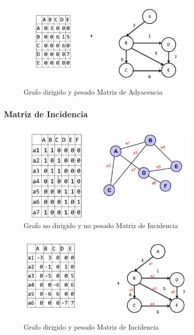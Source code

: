 \documentclass[../main.tex]{subfiles}
\begin{document}
            \begin{figure}[ht]
                \centering
                \includegraphics[width=0.8\textwidth]{images/grafos/grafo_matriz_adyacencia_2}
                \caption{Grafo dirigido y pesado Matriz de Adyacencia} 
            \end{figure}
            
            \newpage

        \subsubsection{Matriz de Incidencia}
            \begin{figure}[ht]
                \centering
                \includegraphics[width=0.8\textwidth]{images/grafos/grafo_matriz_incidencia_1.png}
                \caption{Grafo no dirigido y no pesado Matriz de Incidencia} 
            \end{figure}

            \begin{figure}[ht]
                \centering
                \includegraphics[width=0.8\textwidth]{images/grafos/grafo_matriz_incidencia_2.png}
                \caption{Grafo dirigido y pesado Matriz de Incidencia} 
            \end{figure}
\end{document}
